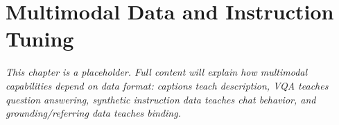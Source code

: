 \chapter{Multimodal Data and Instruction Tuning}
\label{ch:multimodal-data-instruction-tuning}


\textit{This chapter is a placeholder. Full content will explain how multimodal capabilities depend on data format: captions teach description, VQA teaches question answering, synthetic instruction data teaches chat behavior, and grounding/referring data teaches binding.}

